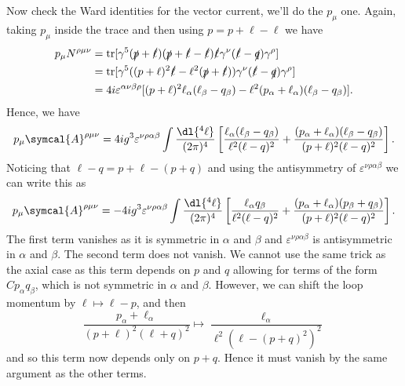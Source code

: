 \documentclass[fleqn]{NotesClass}
\newcommand{\amplitude}{\symcal{A}}
\DeclareMathOperator{\tr}{tr}
\begin{document}
    Now check the Ward identities for the vector current, we'll do the \(p_\mu\) one.
    Again, taking \(p_\mu\) inside the trace and then using \(p = p + \ell - \ell\) we have
    \begin{align}
        p_\mu N^{\rho\mu\nu} &= \tr[\gamma^5(\slashed{p} + \slashed{\ell})(\slashed{p} + \slashed{\ell} - \slashed{\ell})\slashed{\ell} \gamma^\nu (\slashed{\ell} - \slashed{q})\gamma^\rho]\\
        &= \tr[\gamma^5 ((p + \ell)^2\slashed{\ell} - \ell^2(\slashed{p} + \slashed{\ell}))\gamma^\nu (\slashed{\ell} - \slashed{q})\gamma^\rho]\\
        &= 4i\varepsilon^{\alpha\nu\beta\rho} [(p + \ell)^2\ell_\alpha (\ell_\beta - q_\beta) - \ell^2(p_\alpha + \ell_\alpha)(\ell_\beta - q_\beta)].
    \end{align}
    Hence, we have
    \begin{equation}
        p_\mu \amplitude^{\rho\mu\nu} = 4ig^3 \varepsilon^{\nu\rho\alpha\beta} \int \frac{\dl{^4\ell}}{(2\pi)^4} \left[ \frac{\ell_\alpha (\ell_\beta - q_\beta)}{\ell^2(\ell - q)^2} + \frac{(p_\alpha + \ell_\alpha)(\ell_\beta - q_\beta)}{(p + \ell)^2(\ell - q)^2} \right].
    \end{equation}
    Noticing that \(\ell - q = p + \ell - (p + q)\) and using the antisymmetry of \(\varepsilon^{\nu\rho\alpha\beta}\) we can write this as
    \begin{equation}
        p_\mu \amplitude^{\rho\mu\nu} = -4ig^3 \varepsilon^{\nu\rho\alpha\beta} \int \frac{\dl{^4\ell}}{(2\pi)^4} \left[ \frac{\ell_\alpha q_\beta}{\ell^2(\ell - q)^2} + \frac{(p_\alpha + \ell_\alpha)(p_\beta + q_\beta)}{(p + \ell)^2(\ell - q)^2} \right].
    \end{equation}
    The first term vanishes as it is symmetric in \(\alpha\) and \(\beta\) and \(\varepsilon^{\nu\rho\alpha\beta}\) is antisymmetric in \(\alpha\) and \(\beta\).
    The second term does not vanish.
    We cannot use the same trick as the axial case as this term depends on \(p\) and \(q\) allowing for terms of the form \(Cp_\alpha q_\beta\), which is not symmetric in \(\alpha\) and \(\beta\).
    However, we can shift the loop momentum by \(\ell \mapsto \ell - p\), and then
    \begin{equation}
        \frac{p_\alpha + \ell_\alpha}{(p + \ell)^2(\ell + q)^2} \mapsto \frac{\ell_\alpha}{\ell^2(\ell - (p + q)^2)^2}
    \end{equation}
    and so this term now depends only on \(p + q\).
    Hence it must vanish by the same argument as the other terms.
    
\end{document}
